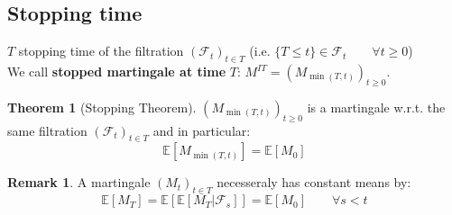 \documentclass[10pt,a4paper]{article}
\theoremstyle{definition}
\newtheorem{teo}{Theorem}[section]
\newtheorem*{rem}{Remark}
\begin{document}
\subsection{Stopping time}
$T$ stopping time of the filtration $(\mathcal{F}_t)_{t\in T}$ (i.e. $\{T\leq t\}\in\mathcal{F}_t \qquad\forall t\geq0$)\\
We call \textbf{stopped martingale at time} $T$: $M^{IT}=(M_{\min{(T,t)}})_{t\geq0}$.
\begin{teo}[Stopping Theorem]
	$(M_{\min{(T,t)}})_{t\geq0}$ is a martingale w.r.t. the same filtration $(\mathcal{F}_t)_{t\in T}$ and in particular:
	\begin{equation}
		\mathbb{E}[M_{\min{(T,t)}}]=\mathbb{E}[M_{0}]
	\end{equation}
\end{teo}
\begin{rem}
	A martingale $(M_t)_{t\in T}$ necesseraly has constant means by:
	\begin{equation*}
		\mathbb{E}[M_{T}]=\mathbb{E}[\mathbb{E}[M_{T}|\mathcal{F}_s]]=\mathbb{E}[M_{0}] \qquad \forall s<t
	\end{equation*} 
\end{rem}
\end{document}
